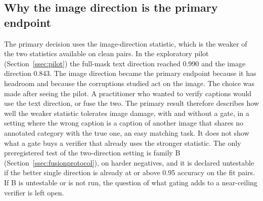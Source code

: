 \subsection{Why the image direction is the primary endpoint}\label{ssec:task}
The primary decision uses the image-direction statistic, which is the weaker of the two statistics available on clean pairs.
In the exploratory pilot (Section~\ref{ssec:pilot}) the full-mask text direction reached 0.990 and the image direction 0.843.
The image direction became the primary endpoint because it has headroom and because the corruptions studied act on the image.
The choice was made after seeing the pilot.
A practitioner who wanted to verify captions would use the text direction, or fuse the two.
The primary result therefore describes how well the weaker statistic tolerates image damage, with and without a gate, in a
setting where the wrong caption is a caption of another image that shares no annotated category with the true one, an easy
matching task.
It does not show what a gate buys a verifier that already uses the stronger statistic.
The only preregistered test of the two-direction setting is family B (Section~\ref{ssec:fusionprotocol}), on harder negatives, and it
is declared untestable if the better single direction is already at or above 0.95 accuracy on the fit pairs.
If B is untestable or is not run, the question of what gating adds to a near-ceiling verifier is left open.

